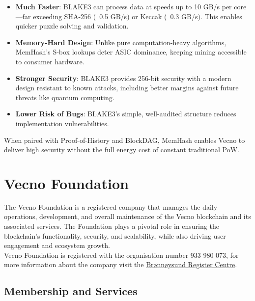 \documentclass[a4paper,onecolumn,superscriptaddress,10pt]{compositionalityarticle}
\begin{document}
\begin{itemize}
\item \textbf{Much Faster}: BLAKE3 can process data at speeds up to 10 GB/s per core—far exceeding SHA-256 (~0.5 GB/s) or Keccak (~0.3 GB/s). This enables quicker puzzle solving and validation.
\item \textbf{Memory-Hard Design}: Unlike pure computation-heavy algorithms, MemHash's S-box lookups deter ASIC dominance, keeping mining accessible to consumer hardware.
\item \textbf{Stronger Security}: BLAKE3 provides 256-bit security with a modern design resistant to known attacks, including better margins against future threats like quantum computing.
\item \textbf{Lower Risk of Bugs}: BLAKE3's simple, well-audited structure reduces implementation vulnerabilities.
\end{itemize}

When paired with Proof-of-History and BlockDAG, MemHash enables Vecno to deliver high security without the full energy cost of constant traditional PoW.

\newpage

\section{Vecno Foundation}

The Vecno Foundation is a registered company that manages the daily operations, development, and overall maintenance of the Vecno blockchain and its associated services. The Foundation plays a pivotal role in ensuring the blockchain's functionality, security, and scalability, while also driving user engagement and ecosystem growth.
\\Vecno Foundation is registered with the organisation number 933 980 073, for more information about the company visit the \href{https://virksomhet.brreg.no/en/oppslag/enheter/933980073}{Brønnøysund Register Centre}.

\vspace{0.3cm}

\subsection{Membership and Services}\label{sec2.1} 
\end{document}
